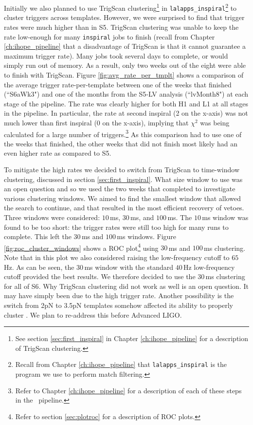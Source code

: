 Initially we also planned to use TrigScan clustering\footnote{See section
\ref{sec:first_inspiral} in Chapter \ref{ch:ihope_pipeline} for a description
of TrigScan clustering.} in \verb|lalapps_inspiral|\footnote{Recall from
Chapter \ref{ch:ihope_pipeline} that \texttt{lalapps\_inspiral} is the program
we use to perform match filtering.} to cluster triggers across templates.
However, we were surprised to find that trigger rates were much higher than in
\ac{S5}. TrigScan clustering was unable to keep the rate low-enough for many
\texttt{inspiral} jobs to finish (recall from Chapter \ref{ch:ihope_pipeline}
that a disadvantage of TrigScan is that it cannot guarantee a maximum trigger
rate). Many jobs took several days to complete, or would simply run out of
memory. As a result, only two weeks out of the eight were able to finish with
TrigScan. Figure \ref{fig:avg_rate_per_tmplt} shows a comparison of the average
trigger rate-per-template between one of the weeks that finished (``S6aWk3")
and one of the months from the \ac{S5}-LV analysis (``lvMonth8") at each stage
of the pipeline. The rate was clearly higher for both H1 and L1 at all stages
in the pipeline. In particular, the rate at second inspiral (2 on the x-axis)
was not much lower than first inspiral (0 on the x-axis), implying that
$\chi^2$ was being calculated for a large number of triggers.\footnote{Refer to
Chapter \ref{ch:ihope_pipeline} for a description of each of these steps in the
\ihope~pipeline.} As this comparison had to use one of the weeks that finished,
the other weeks that did not finish most likely had an even higher rate as
compared to \ac{S5}.

To mitigate the high rates we decided to switch from TrigScan to time-window
clustering, discussed in section \ref{sec:first_inspiral}. What size window to
use was an open question and so we used the two weeks that completed to
investigate various clustering windows. We aimed to find the smallest window
that allowed the search to continue, and that resulted in the most efficient
recovery of vetoes. Three windows were considered: $10\,$ms, $30\,$ms, and
$100\,$ms. The $10\,$ms window was found to be too short: the trigger rates
were still too high for many runs to complete. This left the $30\,$ms and
$100\,$ms windows. Figure \ref{fig:roc_cluster_windows} shows a ROC
plot\footnote{Refer to section \ref{sec:plotroc} for a description of ROC
plots.} using $30\,$ms and $100\,$ms clustering. Note that in this plot we also
considered raising the low-frequency cutoff to $65\,$Hz. As can be seen, the
$30\,$ms window with the standard $40\,$Hz low-frequency cutoff provided the
best results. We therefore decided to use the $30\,$ms clustering for all of
\ac{S6}. Why TrigScan clustering did not work as well is an open question. It
may have simply been due to the high trigger rate. Another possibility is the
switch from 2\ac{pN} to 3.5\ac{pN} templates somehow affected its ability to
properly cluster \cite{Pekowsky:thesis}. We plan to re-address this before
Advanced \ac{LIGO}.

